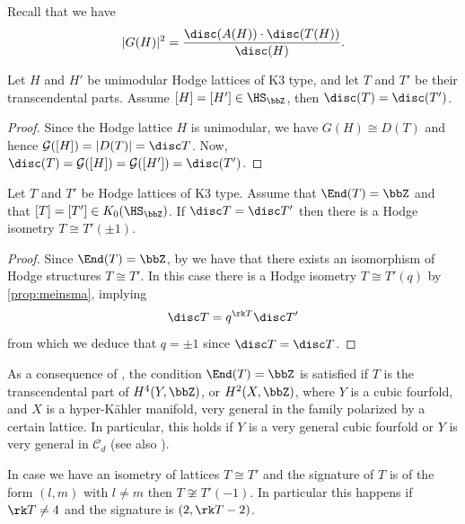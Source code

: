 \documentclass{amsart}
\begin{document}
Recall that we have 
    \[|G(H)|^2=\frac{\disc(A(H))\cdot \disc(T(H))}{\disc(H)}.\]



\begin{lemma}\label{lem:unimod_Hodge_lattices}
    Let \(H\) and \(H'\) be unimodular Hodge lattices of K3 type, and let \(T\) and \(T'\) be their transcendental parts. Assume \([H]=[H']\in \HS_{\bbZ}\), then \(\disc(T)=\disc(T')\).
\end{lemma}
\begin{proof}
     Since the Hodge lattice \(H\) is unimodular, we have \(G(H)\cong D(T)\) and hence \(\mathcal{G}([H])=|D(T)|=\disc T\). Now, \(\disc(T)= \mathcal{G}([H])=\mathcal{G}([H'])=\disc(T')\).
\end{proof}

\begin{lemma}\label{lem:anti_isom}
    Let \(T\) and \(T'\) be Hodge lattices of K3 type. Assume that \(\End(T)=\bbZ\) and that \([T]=[T']\in K_0(\HS_\bbZ)\). If \(\disc T=\disc T'\) then there is a Hodge isometry \(T\cong T'(\pm1)\).
\end{lemma}
\begin{proof}
    Since \(\End(T)=\bbZ\), by \cite[Theorem 2.3]{efimov2018some} we have that there exists an isomorphism of Hodge structures \(T\cong T'\).
    In this case there is a Hodge isometry \(T\cong T'(q)\) by \autoref{prop:meinsma}, implying 
    \[\disc T= q^{\rk T}\disc T'\]
    from which we deduce that \(q=\pm 1\) since \(\disc T=\disc T\).
\end{proof}

\begin{remark}\label{rmk:simple_end_algebra}
      As a consequence of {\cite[Lemma 9]{geemen2016conjecture}}, the condition \(\End(T)=\bbZ\) is satisfied if \(T\) is the transcendental part of \(H^4(Y,\bbZ)\), or \(H^2(X,\bbZ)\), where \(Y\) is a cubic fourfold, and \(X\) is a hyper-Kähler manifold, very general in the family polarized by a certain lattice. In particular, this holds if \(Y\) is a very general cubic fourfold or \(Y\) is very general in \(\mathcal{C}_d\) (see also \cite[Lemma 2.3]{Fan_Lai:New_rational}). 
\end{remark}

\begin{remark}\label{rmk:signatures}
    In case we have an isometry of lattices \(T\cong T'\) and the signature of \(T\) is of the form \((l,m)\) with \(l\not=m\) then \(T\not\cong T'(-1)\). In particular this happens if \(\rk T\not=4\) and the signature is \((2,\rk T-2)\).
\end{remark}
\end{document}

